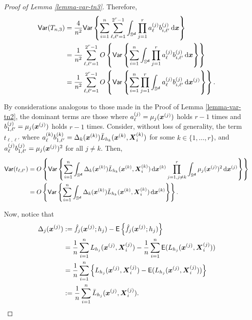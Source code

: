 \documentclass[oneside,11pt]{article}
\begin{document}
\begin{proof}[Proof of Lemma \ref{lemma-var-tn3}]
Therefore,
\begin{align*}
    \mathsf{Var} (T_{n,3}) &= \frac{4}{n^2} \mathsf{Var} \left\{ \sum_{i=1}^{n} \sum_{\ell,\ell'=1}^{2^r -1} \int_{\mathbb{S}^{\boldsymbol{d}}} \prod_{j=1}^r a_\ell^{(j)} b_{i,\ell'}^{(j)} \,\mathrm{d}\boldsymbol{x}\right\} \\
    &= \frac{1}{n^2} \sum_{\ell,\ell'=1}^{2^r -1} O \left\{ \mathsf{Var} \left\{ \sum_{i=1}^{n}  \int_{\mathbb{S}^{\boldsymbol{d}}} \prod_{j=1}^r a_\ell^{(j)} b_{i,\ell'}^{(j)} \,\mathrm{d}\boldsymbol{x}\right\}\right\} \\
    &= \frac{1}{n^2} \sum_{\ell,\ell'=1}^{2^r -1} O \left\{ \mathsf{Var} \left\{ \sum_{i=1}^{n} \prod_{j=1}^r \int_{\mathbb{S}^{\boldsymbol{d}}} a_\ell^{(j)} b_{i,\ell'}^{(j)} \,\mathrm{d}\boldsymbol{x}^{(j)}\right\}\right\}.
\end{align*}

By considerations analogous to those made in the Proof of Lemma \ref{lemma-var-tn2}, the dominant terms are those where $a_{\ell}^{(j)} = \mu_j(\boldsymbol{x}^{(j)})$ holds $r-1$ times and $b_{1,\ell'}^{(j)} = \mu_j(\boldsymbol{x}^{(j)})$ holds $r-1$ times. Consider, without loss of generality, the term $t_{\ell,\ell'}$ where $a_\ell^{(k)} b_{1,\ell'}^{(k)} = \Delta_k(\boldsymbol{x}^{(k)}) \bar{L}_{h_k} (\boldsymbol{x}^{(k)},\boldsymbol{X}_i^{(k)})$ for some $k \in \{1, \dots, r \}$, and $a_\ell^{(j)} b_{1,\ell'}^{(j)} = \mu_j(\boldsymbol{x}^{(j)})^2$ for all $j \ne k$. Then,
\begin{align*}
    \mathsf{Var} (t_{\ell,\ell'}) &= O \left\{ \mathsf{Var} \left\{ \sum_{i=1}^{n} \int_{\mathbb{S}^{\boldsymbol{d}}} \Delta_k(\boldsymbol{x}^{(k)}) \bar{L}_{h_k} (\boldsymbol{x}^{(k)},\boldsymbol{X}_i^{(k)}) \,\mathrm{d}\boldsymbol{x}^{(k)} \prod_{j=1, j \ne k}^r \int_{\mathbb{S}^{\boldsymbol{d}}} \mu_j(\boldsymbol{x}^{(j)})^2 \,\mathrm{d}\boldsymbol{x}^{(j)}\right\}\right\} \\
     &= O \left\{ \mathsf{Var} \left\{ \sum_{i=1}^{n} \int_{\mathbb{S}^{\boldsymbol{d}}} \Delta_k(\boldsymbol{x}^{(k)}) \bar{L}_{h_k} (\boldsymbol{x}^{(k)},\boldsymbol{X}_i^{(k)}) \,\mathrm{d}\boldsymbol{x}^{(k)}\right\}\right\}.
\end{align*}

Now, notice that
\begin{align*}
    \Delta_j(\boldsymbol{x}^{(j)}) &:=  \hat{f}_{j}(\boldsymbol{x}^{(j)};h_j) - \mathsf{E} \left\{ \hat{f}_{j}(\boldsymbol{x}^{(j)};h_j)\right\} \\
    &= \frac{1}{n} \sum_{i=1}^{n} L_{h_j} (\boldsymbol{x}^{(j)},\boldsymbol{X}_i^{(j)}) - \frac{1}{n} \sum_{i=1}^{n} \mathsf{E} (L_{h_j} (\boldsymbol{x}^{(j)},\boldsymbol{X}_i^{(j)})) \\
    &= \frac{1}{n} \sum_{i=1}^{n} \left\{ L_{h_j} (\boldsymbol{x}^{(j)},\boldsymbol{X}_i^{(j)}) - \mathsf{E} (L_{h_j} (\boldsymbol{x}^{(j)},\boldsymbol{X}_i^{(j)}))\right\} \\
    &:= \frac{1}{n} \sum_{i=1}^{n} \bar{L}_{h_j} (\boldsymbol{x}^{(j)},\boldsymbol{X}_i^{(j)}).
\end{align*}

\end{proof}
\end{document}
